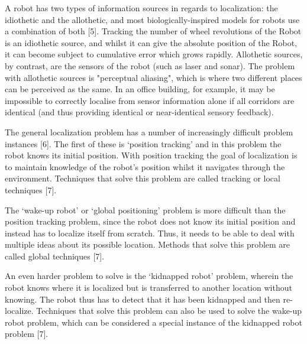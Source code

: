 \documentclass{article}
\begin{document}
A robot has two types of information sources in regards to localization: the idiothetic and the allothetic, and most biologically-inspired models for robots use a combination of both [5]. Tracking the number of wheel revolutions of the Robot is an idiothetic source, and whilst it can give the absolute position of the Robot, it can become subject to cumulative error which grows rapidly. Allothetic sources, by contrast, are the sensors of the robot (such as laser and sonar). The problem with allothetic sources  is "perceptual aliasing", which is where two different places can be perceived as the same. In an office building, for example, it may be impossible to correctly localise from sensor information alone if all corridors are identical (and thus providing identical or near-identical sensory feedback).

The general localization problem has a number of increasingly difficult problem instances [6]. The first of these is ‘position tracking’ and in this problem the robot knows its initial position. With position tracking the goal of localization is to maintain knowledge of the robot’s position whilst it navigates through the environment.  Techniques that solve this problem are called tracking or local techniques [7]. 

The ‘wake-up robot’ or ‘global positioning’ problem is more difficult than the position tracking problem, since the robot does not know its initial position and instead has to localize itself from scratch. Thus, it needs to be able to deal with multiple ideas about its possible location. Methods that solve this problem are called global techniques [7]. 

An even harder problem to solve is the ‘kidnapped robot’ problem, wherein the robot  knows where it is localized but is transferred to another location without knowing. The robot thus has to detect that it has been kidnapped and then re-localize. Techniques that solve this problem can also be used to solve the wake-up robot problem, which can be considered a special instance of the kidnapped robot problem [7].
\end{document}
